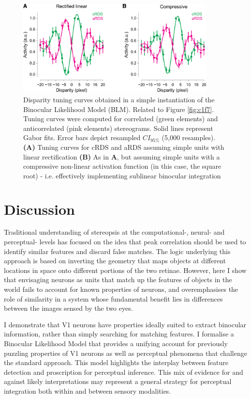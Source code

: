 \begin{figure}[!h]
  \centering
  \includegraphics[width=10cm,keepaspectratio]{FigS7.png}
  \caption[Disparity tuning curves in the Binocular Likelihood Model.]{Disparity tuning curves obtained in a simple instantiation of the Binocular Likelihood Model (BLM). Related to Figure \ref{fig:c1f7}. Tuning curves were computed for correlated (green elements) and anticorrelated (pink elements) stereograms. Solid lines represent Gabor fits. Error bars depict resampled $CI_{95\%}$ (5,000 resamples). \textbf{(A)} Tuning curves for cRDS and aRDS assuming simple units with linear rectification \textbf{(B)} As in \textbf{A}, but assuming simple units with a compressive non-linear activation function (in this case, the square root) - i.e. effectively implementing sublinear binocular integration \cite{Longordo2013}}
  \label{fig:c1fs7}
\end{figure}



\section{Discussion}

Traditional understanding of stereopsis at the computational-, neural- and perceptual- levels has focused on the idea that peak correlation should be used to identify similar features and discard false matches. The logic underlying this approach is based on inverting the geometry that maps objects at different locations in space onto different portions of the two retinae. However, here I show that envisaging neurons as units that match up the features of objects in the world fails to account for known properties of neurons, and overemphasises the role of similarity in a system whose fundamental benefit lies in differences between the images sensed by the two eyes. 

I demonstrate that V1 neurons have properties ideally suited to extract binocular information, rather than simply searching for matching features. I formalise a Binocular Likelihood Model that provides a unifying account for previously puzzling properties of V1 neurons as well as perceptual phenomena that challenge the standard approach. This model highlights the interplay between feature detection and proscription for perceptual inference. This mix of evidence for and against likely interpretations may represent a general strategy for perceptual integration both within and between sensory modalities.

